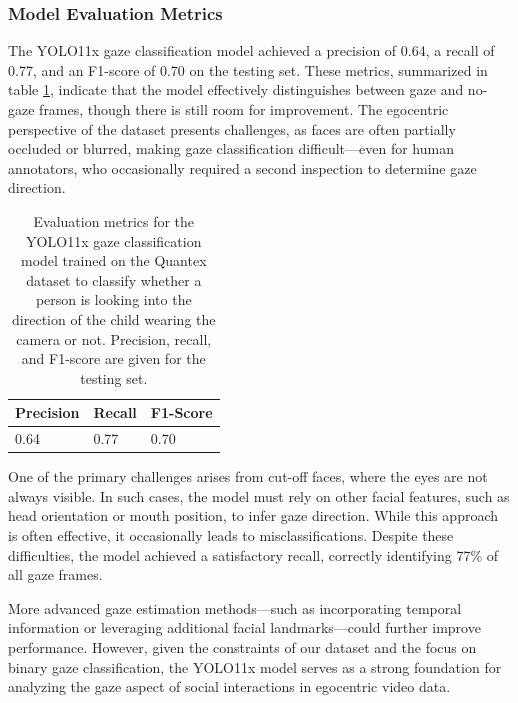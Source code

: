 \documentclass[
  man,floatsintext]{apa6}
\begin{document}
\subsubsection{Model Evaluation Metrics}\label{model-evaluation-metrics-1}

The YOLO11x gaze classification model achieved a precision of 0.64, a recall of 0.77, and an F1-score of 0.70 on the testing set. These metrics, summarized in table \ref{tab:gaze-metrics}, indicate that the model effectively distinguishes between gaze and no-gaze frames, though there is still room for improvement. The egocentric perspective of the dataset presents challenges, as faces are often partially occluded or blurred, making gaze classification difficult---even for human annotators, who occasionally required a second inspection to determine gaze direction.

\begin{table}[tbp]

\begin{center}
\begin{threeparttable}

\caption{\label{tab:gaze-metrics}Evaluation metrics for the YOLO11x gaze classification model trained on the Quantex dataset to classify whether a person is looking into the direction of the child wearing the camera or not. Precision, recall, and F1-score are given for the testing set.}

\begin{tabular}{lll}
\toprule
Precision & \multicolumn{1}{c}{Recall} & \multicolumn{1}{c}{F1-Score}\\
\midrule
0.64 & 0.77 & 0.70\\
\bottomrule
\end{tabular}

\end{threeparttable}
\end{center}

\end{table}

One of the primary challenges arises from cut-off faces, where the eyes are not always visible. In such cases, the model must rely on other facial features, such as head orientation or mouth position, to infer gaze direction. While this approach is often effective, it occasionally leads to misclassifications. Despite these difficulties, the model achieved a satisfactory recall, correctly identifying 77\% of all gaze frames.

More advanced gaze estimation methods---such as incorporating temporal information or leveraging additional facial landmarks---could further improve performance. However, given the constraints of our dataset and the focus on binary gaze classification, the YOLO11x model serves as a strong foundation for analyzing the gaze aspect of social interactions in egocentric video data.
\end{document}
